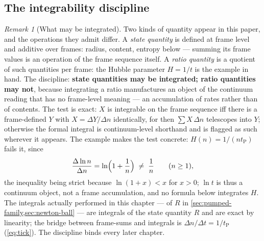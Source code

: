 \documentclass[11pt]{amsbook}
\theoremstyle{plain}
\theoremstyle{definition}
\theoremstyle{remark}
\newtheorem{remark}[theorem]{Remark}
\begin{document}
\subsection{The integrability discipline}

\begin{remark}[What may be integrated]\label{rem:integrability}
Two kinds of quantity appear in this paper, and the operations they admit differ. A \emph{state quantity} is defined at frame level and additive over frames: radius, content, entropy below --- summing its frame values is an operation of the frame sequence itself. A \emph{ratio quantity} is a quotient of such quantities per frame: the Hubble parameter $H = 1/t$ is the example in hand. The discipline: \textbf{state quantities may be integrated; ratio quantities may not}, because integrating a ratio manufactures an object of the continuum reading that has no frame-level meaning --- an accumulation of rates rather than of contents. The test is exact: $X$ is integrable on the frame sequence iff there is a frame-defined $Y$ with $X = \Delta Y / \Delta n$ identically, for then $\sum X\,\Delta n$ telescopes into $Y$; otherwise the formal integral is continuum-level shorthand and is flagged as such wherever it appears. The example makes the test concrete: $H(n) = 1/(n t_{\mathrm P})$ fails it, since
\begin{equation}\label{eq:lnfails}
\frac{\Delta \ln n}{\Delta n} = \ln\Bigl(1 + \frac{1}{n}\Bigr) \;\neq\; \frac{1}{n} \qquad (n \geq 1),
\end{equation}
the inequality being strict because $\ln(1 + x) < x$ for $x > 0$; $\ln t$ is thus a continuum object, not a frame accumulation, and no formula below integrates $H$. The integrals actually performed in this chapter --- of $R$ in \cref{sec:pumped-family,sec:newton-ball} --- are integrals of the state quantity $R$ and are exact by linearity; the bridge between frame-sums and integrals is $\Delta n / \Delta t = 1/t_{\mathrm P}$ (\cref{eq:tick}). The discipline binds every later chapter.
\end{remark}
\end{document}
